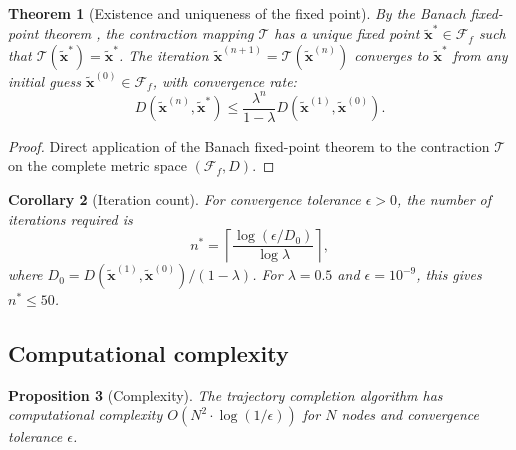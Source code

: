 \documentclass[twocolumn,10pt,a4paper]{article}
\newtheorem{theorem}{Theorem}[section]
\newtheorem{proposition}[theorem]{Proposition}
\newtheorem{corollary}[theorem]{Corollary}
\theoremstyle{definition}
\theoremstyle{remark}
\newcommand{\Fcal}{\mathcal{F}}
\newcommand{\Tcal}{\mathcal{T}}
\newcommand{\vect}[1]{\boldsymbol{#1}}
\newcommand{\fuzzy}[1]{\widetilde{#1}}
\begin{document}
\begin{theorem}[Existence and uniqueness of the fixed point]\label{thm:fixed_point}
By the Banach fixed-point theorem \citep{Banach1922, Granas2003}, the contraction mapping $\Tcal$ has a unique fixed point $\fuzzy{\vect{x}}^* \in \Fcal_f$ such that $\Tcal(\fuzzy{\vect{x}}^*) = \fuzzy{\vect{x}}^*$. The iteration $\fuzzy{\vect{x}}^{(n+1)} = \Tcal(\fuzzy{\vect{x}}^{(n)})$ converges to $\fuzzy{\vect{x}}^*$ from any initial guess $\fuzzy{\vect{x}}^{(0)} \in \Fcal_f$, with convergence rate:
\begin{equation}\label{eq:convergence_rate}
    D(\fuzzy{\vect{x}}^{(n)}, \fuzzy{\vect{x}}^*) \leq \frac{\lambda^n}{1 - \lambda} D(\fuzzy{\vect{x}}^{(1)}, \fuzzy{\vect{x}}^{(0)}).
\end{equation}
\end{theorem}

\begin{proof}
Direct application of the Banach fixed-point theorem to the contraction $\Tcal$ on the complete metric space $(\Fcal_f, D)$.
\end{proof}

\begin{corollary}[Iteration count]\label{cor:iterations}
For convergence tolerance $\epsilon > 0$, the number of iterations required is
\begin{equation}\label{eq:iteration_count}
    n^* = \left\lceil \frac{\log(\epsilon / D_0)}{\log \lambda} \right\rceil,
\end{equation}
where $D_0 = D(\fuzzy{\vect{x}}^{(1)}, \fuzzy{\vect{x}}^{(0)}) / (1 - \lambda)$. For $\lambda = 0.5$ and $\epsilon = 10^{-9}$, this gives $n^* \leq 50$.
\end{corollary}

\subsection{Computational complexity}

\begin{proposition}[Complexity]\label{prop:complexity}
The trajectory completion algorithm has computational complexity $O(N^2 \cdot \log(1/\epsilon))$ for $N$ nodes and convergence tolerance $\epsilon$.
\end{proposition}
\end{document}
